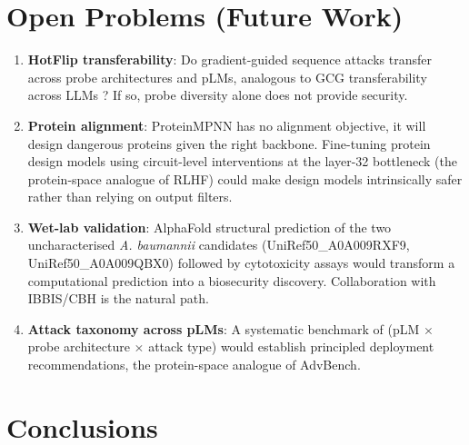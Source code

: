 \documentclass[11pt,a4paper]{article}
\begin{document}
\section{Open Problems (Future Work)}

\begin{enumerate}
    \item \textbf{HotFlip transferability}: Do gradient-guided sequence attacks transfer across probe architectures and pLMs, analogous to GCG transferability across LLMs \cite{zou2023universal}? If so, probe diversity alone does not provide security.
    
    \item \textbf{Protein alignment}: ProteinMPNN has no alignment objective, it will design dangerous proteins given the right backbone. Fine-tuning protein design models using circuit-level interventions at the layer-32 bottleneck (the protein-space analogue of RLHF) could make design models intrinsically safer rather than relying on output filters.
    
    \item \textbf{Wet-lab validation}: AlphaFold structural prediction of the two uncharacterised \textit{A. baumannii} candidates (UniRef50\_A0A009RXF9, UniRef50\_A0A009QBX0) followed by cytotoxicity assays would transform a computational prediction into a biosecurity discovery. Collaboration with IBBIS/CBH is the natural path.
    
    \item \textbf{Attack taxonomy across pLMs}: A systematic benchmark of (pLM $\times$ probe architecture $\times$ attack type) would establish principled deployment recommendations, the protein-space analogue of AdvBench.
\end{enumerate}

\section{Conclusions}
\end{document}
